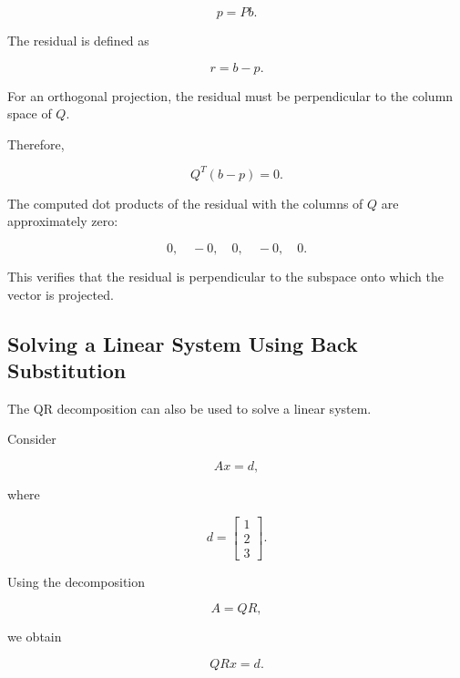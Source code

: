 \documentclass[12pt,a4paper]{article}
\numberwithin{equation}{section}
\begin{document}
\begin{equation}
p=Pb.
\end{equation}

The residual is defined as

\begin{equation}
r=b-p.
\end{equation}

For an orthogonal projection, the residual must
be perpendicular to the column space of $Q$.

Therefore,

\begin{equation}
\boxed{Q^T(b-p)=0}.
\end{equation}

The computed dot products of the residual with
the columns of $Q$ are approximately zero:

\begin{equation}
0,\quad -0,\quad 0,\quad -0,\quad 0.
\end{equation}

This verifies that the residual is perpendicular
to the subspace onto which the vector is projected.

\subsection{Solving a Linear System Using Back Substitution}

The QR decomposition can also be used to solve
a linear system.

Consider

\begin{equation}
Ax=d,
\end{equation}

where

\begin{equation}
d=
\begin{bmatrix}
1\\2\\3
\end{bmatrix}.
\end{equation}

Using the decomposition

\begin{equation}
A=QR,
\end{equation}

we obtain

\begin{equation}
QRx=d.
\end{equation}
\end{document}
